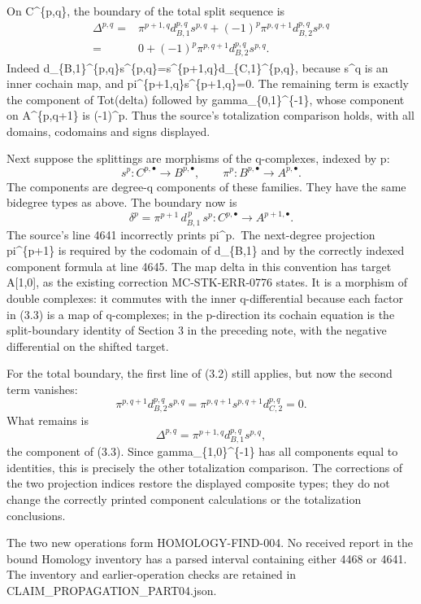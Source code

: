 \documentclass[11pt]{article}
\begin{document}
On C\^{}\{p,q\}, the boundary of the total split sequence is \[
\begin{aligned}
\Delta^{p,q}
={}&\pi^{p+1,q}d_{B,1}^{p,q}s^{p,q}
 +(-1)^p\pi^{p,q+1}d_{B,2}^{p,q}s^{p,q}\\
={}&0+(-1)^p\pi^{p,q+1}d_{B,2}^{p,q}s^{p,q}.
\end{aligned}                                               \tag{3.2}
\] Indeed d\_\{B,1\}\^{}\{p,q\}s\^{}\{p,q\}=s\^{}\{p+1,q\}d\_\{C,1\}\^{}\{p,q\}, because s\^{}q is an inner cochain map, and pi\^{}\{p+1,q\}s\^{}\{p+1,q\}=0. The remaining term is exactly the component of Tot(delta) followed by gamma\_\{0,1\}\^{}\{-1\}, whose component on A\^{}\{p,q+1\} is (-1)\^{}p. Thus the source's totalization comparison holds, with all domains, codomains and signs displayed.

Next suppose the splittings are morphisms of the q-complexes, indexed by p: \[
s^p:C^{p,\bullet}\longrightarrow B^{p,\bullet},\qquad
\pi^p:B^{p,\bullet}\longrightarrow A^{p,\bullet}.
\] The components are degree-q components of these families. They have the same bidegree types as above. The boundary now is \[
\boxed{\quad
\delta^p=\pi^{p+1}\,d_{B,1}^{\,p}\,s^p:
C^{p,\bullet}\longrightarrow A^{p+1,\bullet}.
\quad}                                                     \tag{3.3}
\] The source's line 4641 incorrectly prints pi\^{}p.~The next-degree projection pi\^{}\{p+1\} is required by the codomain of d\_\{B,1\} and by the correctly indexed component formula at line 4645. The map delta in this convention has target A{[}1,0{]}, as the existing correction MC-STK-ERR-0776 states. It is a morphism of double complexes: it commutes with the inner q-differential because each factor in (3.3) is a map of q-complexes; in the p-direction its cochain equation is the split-boundary identity of Section 3 in the preceding note, with the negative differential on the shifted target.

For the total boundary, the first line of (3.2) still applies, but now the second term vanishes: \[
\pi^{p,q+1}d_{B,2}^{p,q}s^{p,q}
=\pi^{p,q+1}s^{p,q+1}d_{C,2}^{p,q}=0.
\] What remains is \[
\Delta^{p,q}=\pi^{p+1,q}d_{B,1}^{p,q}s^{p,q},
\] the component of (3.3). Since gamma\_\{1,0\}\^{}\{-1\} has all components equal to identities, this is precisely the other totalization comparison. The corrections of the two projection indices restore the displayed composite types; they do not change the correctly printed component calculations or the totalization conclusions.

The two new operations form HOMOLOGY-FIND-004. No received report in the bound Homology inventory has a parsed interval containing either 4468 or 4641. The inventory and earlier-operation checks are retained in CLAIM\_PROPAGATION\_PART04.json.
\end{document}
